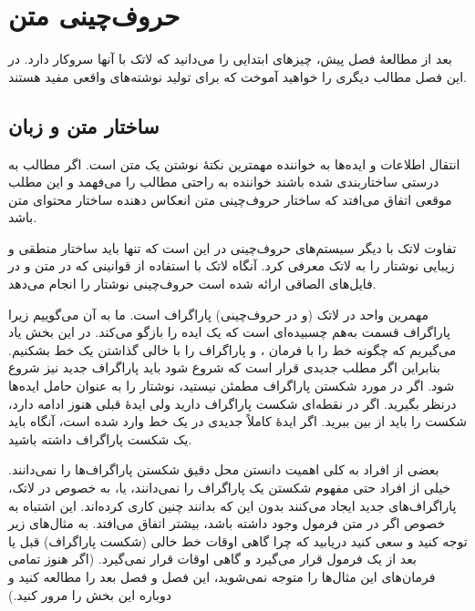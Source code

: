 \chapter{حروف‌چینی متن}
\begin{intro}
بعد از مطالعهٔ فصل پیش، چیزهای ابتدایی را می‌دانید که لاتک با آنها سروکار دارد. در این فصل مطالب دیگری را خواهید آموخت که برای تولید نوشته‌های واقعی مفید هستند.
\end{intro}
\section{ساختار متن و زبان}
 انتقال اطلاعات و ایده‌ها به خواننده مهمترین نکتهٔ نوشتن یک متن است. اگر مطالب به درستی ساختاربندی شده باشند خواننده به راحتی مطالب را می‌فهمد و این مطلب موقعی اتفاق می‌افتد که ساختار حروف‌چینی متن انعکاس دهنده ساختار محتوای متن باشد.

تفاوت لاتک با دیگر سیستم‌های حروف‌چینی در این است که تنها باید ساختار منطقی و زیبایی نوشتار را به لاتک معرفی کرد. آنگاه لاتک  با استفاده از قوانینی که در متن و در فایل‌های الصاقی ارائه شده است حروف‌چینی نوشتار را انجام می‌دهد. 

مهمرین واحد در لاتک 
(و در حروف‌چینی)
پاراگراف 
 است. ما به آن 
می‌گوییم زیرا پاراگراف قسمت به‌هم‌ چسبیده‌ای است که یک ایده را بازگو می‌کند. در این بخش یاد می‌گیریم که چگونه خط را با فرمان \texttt{\bs\bs}، 
و پاراگراف‌ را با خالی گذاشتن یک خط بشکنیم. بنابراین اگر مطلب جدیدی قرار است که شروع شود باید پاراگراف جدید نیز شروع شود. 
اگر در مورد شکستن پاراگراف مطمئن نیستید، نوشتار را به عنوان حامل ایده‌ها درنظر بگیرید. اگر در نقطه‌ای شکست پاراگراف دارید 
ولی ایدۀ قبلی هنوز ادامه دارد، شکست را باید از بین ببرید. اگر ایدۀ کاملاً جدیدی در یک خط وارد شده است، آنگاه باید یک شکست پاراگراف داشته باشید.

بعضی از افراد به کلی اهمیت دانستن محل دقیق شکستن پاراگراف‌ها را نمی‌دانند. خیلی از افراد حتی مفهوم شکستن یک پاراگراف را نمی‌دانند، یا، به خصوص در لاتک، 
پاراگراف‌های جدید ایجاد می‌کنند بدون این که بدانند چنین کاری کرده‌اند. این اشتباه به خصوص اگر در متن فرمول وجود داشته باشد، بیشتر اتفاق می‌افتد. 
به مثال‌های زیر توجه کنید و سعی کنید دریابید که چرا گاهی اوقات خط خالی 
(شکست پاراگراف)
قبل یا بعد از یک فرمول قرار می‌گیرد و گاهی اوقات قرار نمی‌گیرد.
(اگر هنوز تمامی فرمان‌های این مثال‌ها را متوجه نمی‌شوید، این فصل و فصل بعد را مطالعه کنید و دوباره این بخش را مرور کنید.)

